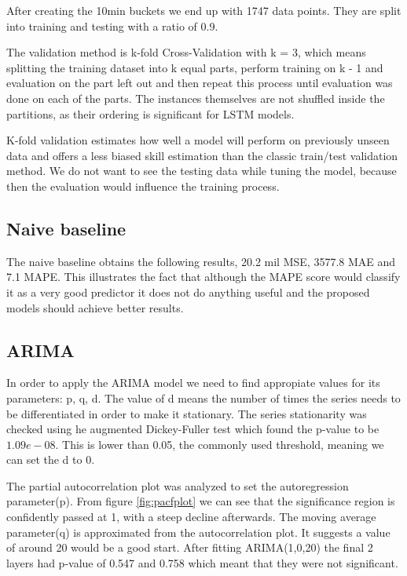 \documentclass[12pt]{article}
\begin{document}
After creating the 10min buckets we end up with 1747 data points. They are split into training and testing with a ratio of 0.9.

The validation method is k-fold Cross-Validation\cite{kfold} with k = 3, which means splitting the training dataset into k equal parts, perform training on k - 1 and evaluation on the part left out and then repeat this process until evaluation was done on each of the parts. The instances themselves are not shuffled inside the partitions, as their ordering is significant for LSTM models. 

K-fold validation estimates how well a model will perform on previously unseen data and offers a less biased skill estimation than the classic train/test validation method.
We do not want to see the testing data while tuning the model, because then the evaluation would influence the training process.

\subsection{Naive baseline}
The naive baseline obtains the following results, 20.2 mil MSE, 3577.8 MAE and 7.1 MAPE. This illustrates the fact that although the MAPE score would classify it as a very good predictor it does not do anything useful and the proposed models should achieve better results.

\subsection{ARIMA}
In order to apply the ARIMA model we need to find appropiate values for its parameters: p, q, d. The value of d means the number of times the series needs to be differentiated in order to make it stationary. The series stationarity was checked using he augmented Dickey-Fuller test\cite{Dickey-Fuller} which found the p-value to be $1.09e-08$. This is lower than 0.05, the commonly used threshold, meaning we can set the d to 0.

The partial autocorrelation plot was analyzed to set the autoregression parameter(p). From figure \ref{fig:pacfplot} we can see that the significance region is confidently passed at 1, with a steep decline afterwards. The moving average parameter(q) is approximated from the autocorrelation plot. It suggests a value of around 20 would be a good start. After fitting ARIMA(1,0,20) the final 2 layers had p-value of 0.547 and 0.758 which meant that they were not significant. 
\end{document}
